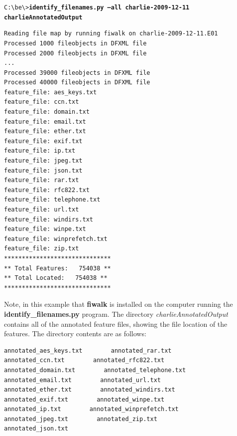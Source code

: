 \begingroup
\footnotesize
\texttt{C:\textbackslash be\textbackslash \textgreater \textbf{identify\_filenames.py --all charlie-2009-12-11 charlieAnnotatedOutput}}
\endgroup
\begingroup
\footnotesize
\begin{Verbatim}[fontfamily=courier, commandchars=\\\{\}]
Reading file map by running fiwalk on charlie-2009-12-11.E01
Processed 1000 fileobjects in DFXML file
Processed 2000 fileobjects in DFXML file
...
Processed 39000 fileobjects in DFXML file
Processed 40000 fileobjects in DFXML file
feature_file: aes_keys.txt
feature_file: ccn.txt
feature_file: domain.txt
feature_file: email.txt
feature_file: ether.txt
feature_file: exif.txt
feature_file: ip.txt
feature_file: jpeg.txt
feature_file: json.txt
feature_file: rar.txt
feature_file: rfc822.txt
feature_file: telephone.txt
feature_file: url.txt
feature_file: windirs.txt
feature_file: winpe.txt
feature_file: winprefetch.txt
feature_file: zip.txt
******************************
** Total Features:   754038 **
** Total Located:   754038 **
******************************
\end{Verbatim}
\endgroup

Note, in this example that \textbf{fiwalk} is installed on the computer running the \textbf{identify\_filenames.py} program. The directory \textit{charlieAnnotatedOutput} contains all of the annotated feature files, showing the file location of the features. The directory contents are as follows:

\begingroup
\footnotesize
\begin{Verbatim} 
annotated_aes_keys.txt        annotated_rar.txt
annotated_ccn.txt        annotated_rfc822.txt
annotated_domain.txt        annotated_telephone.txt
annotated_email.txt        annotated_url.txt
annotated_ether.txt        annotated_windirs.txt
annotated_exif.txt        annotated_winpe.txt
annotated_ip.txt        annotated_winprefetch.txt
annotated_jpeg.txt        annotated_zip.txt
annotated_json.txt
\end{Verbatim}
\endgroup

